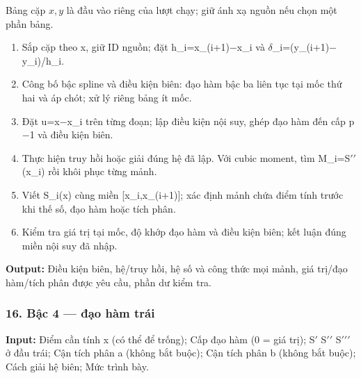 Bảng cặp $x,y$ là đầu vào riêng của lượt chạy; giữ ánh xạ nguồn nếu chọn một phần bảng.

\begin{enumerate}

\item Sắp cặp theo x,\allowbreak{} giữ ID nguồn;\allowbreak{} đặt h\_i=\allowbreak{}x\_(\allowbreak{}i+\allowbreak{}1)\ensuremath{-}x\_i và \ensuremath{\delta}\_i=\allowbreak{}(\allowbreak{}y\_(\allowbreak{}i+\allowbreak{}1)\ensuremath{-}y\_i)/\allowbreak{}h\_i.

\item Công bố bậc spline và điều kiện biên: đạo hàm bậc ba liên tục tại mốc thứ hai và áp chót;\allowbreak{} xử lý riêng bảng ít mốc.

\item Đặt u=\allowbreak{}x\ensuremath{-}x\_i trên từng đoạn;\allowbreak{} lập điều kiện nội suy,\allowbreak{} ghép đạo hàm đến cấp p\ensuremath{-}1 và điều kiện biên.

\item Thực hiện truy hồi hoặc giải đúng hệ đã lập. Với cubic moment,\allowbreak{} tìm M\_i=\allowbreak{}S\ensuremath{\prime\prime}(\allowbreak{}x\_i) rồi khôi phục từng mảnh.

\item Viết S\_i(\allowbreak{}x) cùng miền [x\_i,\allowbreak{}x\_(\allowbreak{}i+\allowbreak{}1)];\allowbreak{} xác định mảnh chứa điểm tính trước khi thế số,\allowbreak{} đạo hàm hoặc tích phân.

\item Kiểm tra giá trị tại mốc,\allowbreak{} độ khớp đạo hàm và điều kiện biên;\allowbreak{} kết luận đúng miền nội suy đã nhập.

\end{enumerate}

\textbf{Output:} Điều kiện biên,\allowbreak{} hệ/\allowbreak{}truy hồi,\allowbreak{} hệ số và công thức mọi mảnh,\allowbreak{} giá trị/\allowbreak{}đạo hàm/\allowbreak{}tích phân được yêu cầu,\allowbreak{} phần dư kiểm tra.

\examplebreak\subsubsection*{16. Bậc 4 — đạo hàm trái}

\textbf{Input:} Điểm cần tính x (\allowbreak{}có thể để trống);\allowbreak{} Cấp đạo hàm (\allowbreak{}0 =\allowbreak{} giá trị);\allowbreak{} S\ensuremath{\prime} S\ensuremath{\prime}\ensuremath{\prime} S\ensuremath{\prime}\ensuremath{\prime}\ensuremath{\prime} ở đầu trái;\allowbreak{} Cận tích phân a (\allowbreak{}không bắt buộc);\allowbreak{} Cận tích phân b (\allowbreak{}không bắt buộc);\allowbreak{} Cách giải hệ biên;\allowbreak{} Mức trình bày.

